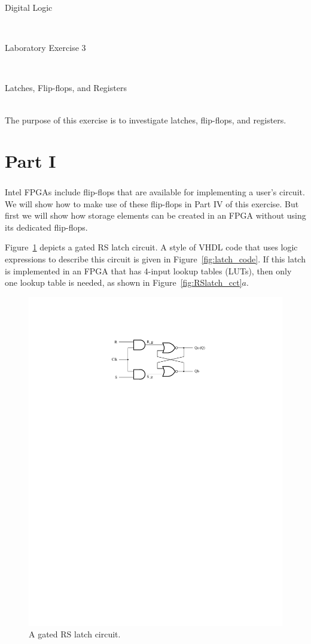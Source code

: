 \documentclass[epsfig,10pt,fullpage]{article}
\newcommand{\LabNum}{3}
\begin{document}
\centerline{\huge Digital Logic}
~\\
\centerline{\huge Laboratory Exercise \LabNum}
~\\
\centerline{\large Latches, Flip-flops, and Registers}
~\\

\noindent
The purpose of this exercise is to investigate latches, flip-flops, and registers.

\section*{Part I}
Intel\textsuperscript{\textregistered} FPGAs include flip-flops that are available for implementing a user's circuit. 
We will show how to make use of these flip-flops in Part IV of this exercise. But
first we will show how storage elements can be created in an FPGA without using 
its dedicated flip-flops.

Figure~\ref{fig:RSlatch} depicts a gated RS latch circuit. A style of VHDL code that 
uses logic expressions to describe this circuit is given in Figure~\ref{fig:latch_code}.
If this latch is implemented in an FPGA that has 4-input lookup tables (LUTs),
then only one lookup table is needed, as shown in Figure~\ref{fig:RSlatch_cct}$a$.  

\begin{figure}[H]
	\begin{center}
		\includegraphics[scale=.9]{figures/RS_latch.pdf}
	\end{center}
\caption{A gated RS latch circuit.}
\label{fig:RSlatch}
\end{figure}
\end{document}
